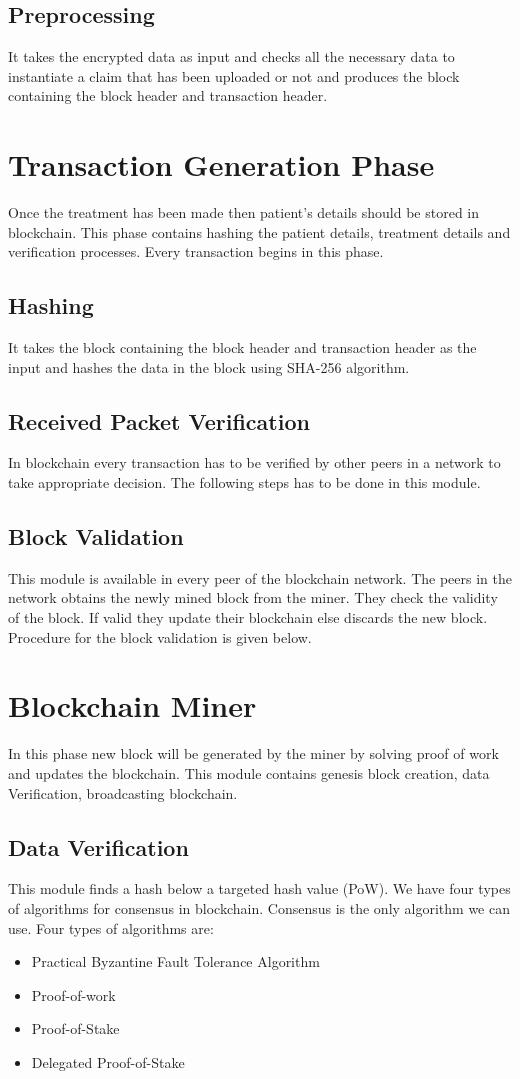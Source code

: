 \subsection{Preprocessing}
It takes the encrypted data as input and checks all the necessary data to instantiate a claim that has been uploaded or not and produces the block containing the block header and transaction header.
\section{Transaction Generation Phase}
Once the treatment has been made then patient’s details should be stored in blockchain. This phase contains hashing the patient details, treatment details and verification processes. Every transaction begins in this phase.
\subsection{Hashing}
It takes the block containing the block header and transaction header as the input and hashes the data in the block using SHA-256 algorithm.
\subsection{Received Packet Verification}
In blockchain every transaction has to be verified by other peers in a network to take appropriate decision. The following steps has to be done in this module.
\subsection{Block Validation}
This module is available in every peer of the blockchain network. The peers in the network obtains the newly mined block from the miner. They check the validity of the block. If valid they update their blockchain else discards the new block. Procedure for the block validation is given below.
\section{Blockchain Miner}
In this phase new block will be generated by the miner by solving proof of work and updates the blockchain. This module contains genesis block creation, data Verification, broadcasting blockchain.
\subsection{Data Verification}
This module finds a hash below a targeted hash value (PoW). We have four types of algorithms for consensus in blockchain. Consensus is the only algorithm we can use. Four types of algorithms are:
\begin{itemize}
    \item Practical Byzantine Fault Tolerance Algorithm
\item Proof-of-work
\item Proof-of-Stake
\item Delegated Proof-of-Stake
\end{itemize}
